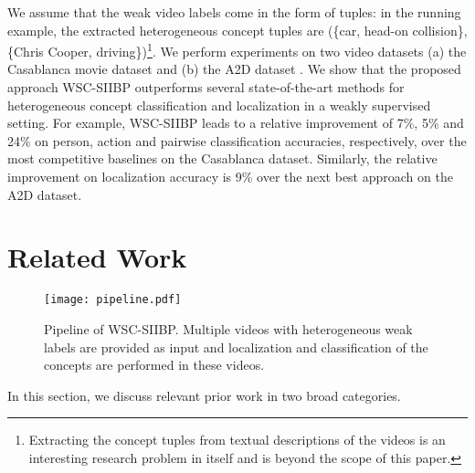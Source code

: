 \documentclass[runningheads]{llncs}
\begin{document}
We assume that the weak video labels come in the form of tuples: in the running example, the extracted heterogeneous concept tuples are (\{car, head-on collision\}, \{Chris Cooper, driving\})\footnote{Extracting the concept tuples from textual descriptions of the videos is an interesting research problem in itself and is beyond the scope of this paper.}. We perform experiments on two video datasets (a) the Casablanca movie dataset \cite{bojanowski2013finding} and (b) the A2D dataset \cite{xu2015can}. We show that the proposed approach WSC-SIIBP outperforms several state-of-the-art methods for heterogeneous concept classification and localization in a weakly supervised setting. 
For example, WSC-SIIBP leads to a relative improvement of 7\%, 5\% and 24\% on person, action and pairwise classification accuracies, respectively, over the most competitive baselines on the Casablanca dataset. Similarly, the relative improvement on localization accuracy is 9\% over the next best approach on the A2D dataset.

\section{Related Work}

\begin{figure}[!tp]
\centering
\texttt{[image: pipeline.pdf]}
\caption{Pipeline of WSC-SIIBP. Multiple videos with heterogeneous weak labels are provided as input and localization and classification of the concepts are performed in these videos.}
\label{pipeline}
\vspace{-6mm}
\end{figure}

In this section, we discuss relevant prior work in two broad categories.  
\end{document}
